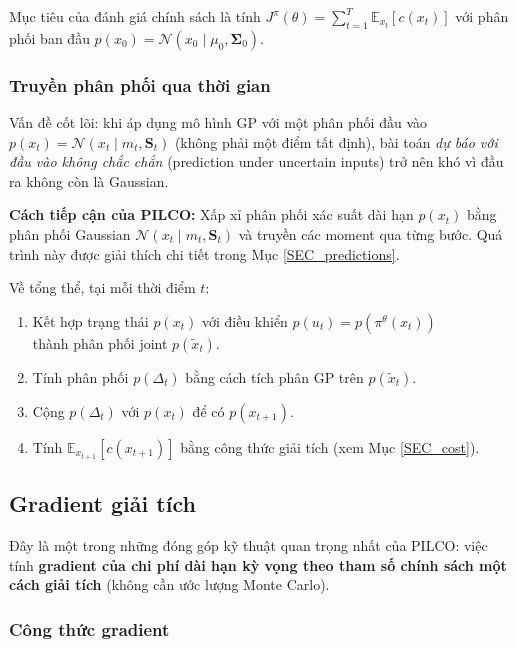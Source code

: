 Mục tiêu của đánh giá chính sách là tính $J^\pi(\theta) = \sum_{t=1}^{T} \mathbb{E}_{x_t}[c(x_t)]$ với phân phối ban đầu $p(x_0) = \mathcal{N}(x_0 \mid \mu_0, \boldsymbol{\Sigma}_0)$.

\subsubsection{Truyền phân phối qua thời gian}
\label{SUB_SUB_SEC_distribution_propagation}

Vấn đề cốt lõi: khi áp dụng mô hình GP với một phân phối đầu vào $p(x_t) = \mathcal{N}(x_t \mid m_t, \mathbf{S}_t)$ (không phải một điểm tất định), bài toán \textit{dự báo với đầu vào không chắc chắn} (prediction under uncertain inputs) trở nên khó vì đầu ra không còn là Gaussian.

\textbf{Cách tiếp cận của PILCO:} Xấp xỉ phân phối xác suất dài hạn $p(x_t)$ bằng phân phối Gaussian $\mathcal{N}(x_t \mid m_t, \mathbf{S}_t)$ và truyền các moment qua từng bước. Quá trình này được giải thích chi tiết trong Mục \ref{SEC_predictions}.

Về tổng thể, tại mỗi thời điểm $t$:
\begin{enumerate}
    \item Kết hợp trạng thái $p(x_t)$ với điều khiển $p(u_t) = p(\pi^\theta(x_t))$\\ thành phân phối joint $p(\tilde{x}_t)$.
    \item Tính phân phối $p(\Delta_t)$ bằng cách tích phân GP trên $p(\tilde{x}_t)$.
    \item Cộng $p(\Delta_t)$ với $p(x_t)$ để có $p(x_{t+1})$.
    \item Tính $\mathbb{E}_{x_{t+1}}[c(x_{t+1})]$ bằng công thức giải tích (xem Mục \ref{SEC_cost}).
\end{enumerate}

\subsection{Gradient giải tích}
\label{SUB_SEC_analytic_gradient}

Đây là một trong những đóng góp kỹ thuật quan trọng nhất của PILCO: việc tính \textbf{gradient của chi phí dài hạn kỳ vọng theo tham số chính sách một cách giải tích} (không cần ước lượng Monte Carlo).

\subsubsection{Công thức gradient}
\label{SUB_SUB_SEC_gradient_formula}

